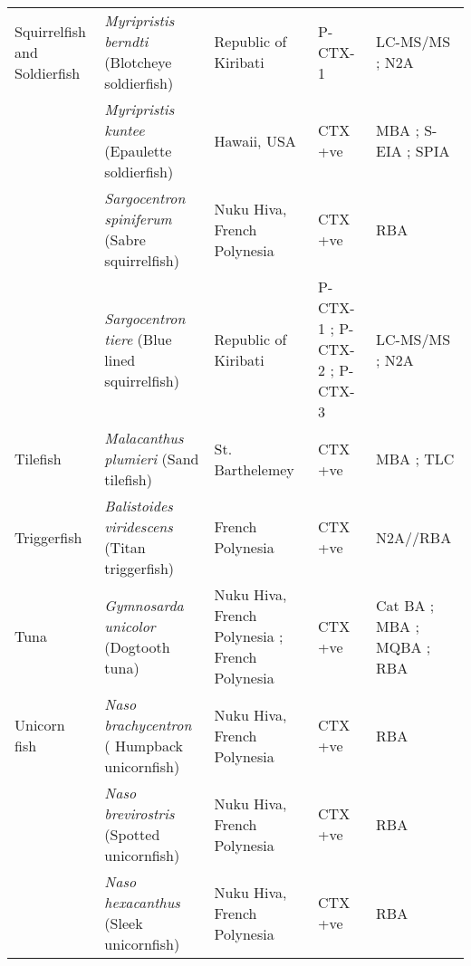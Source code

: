 \documentclass[12pt]{article}
\begin{document}
\begin{longtable}[l]{ | p{2cm} | p{3cm} | p{4.5cm} | p{2cm} | p{3cm} | }
	\hline
	Squirrelfish and Soldierfish & \emph{Myripristis berndti} (Blotcheye soldierfish) & Republic of Kiribati \cite{mak2013pacific} & P-CTX-1 \cite{mak2013pacific} & LC-MS/MS \cite{mak2013pacific}; N2A \cite{mak2013pacific} \\
	& \emph{Myripristis kuntee} (Epaulette soldierfish) & Hawaii, USA \cite{hokama1993evaluation} & CTX +ve \cite{hokama1993evaluation} & MBA \cite{hokama1993evaluation}; S-EIA \cite{hokama1993evaluation}; SPIA \cite{hokama1993evaluation}\\
	& \emph{Sargocentron spiniferum} (Sabre squirrelfish) & Nuku Hiva, French Polynesia \cite{darius2007ciguatera} & CTX +ve \cite{darius2007ciguatera} & RBA \cite{darius2007ciguatera} \\
	& \emph{Sargocentron tiere} (Blue lined squirrelfish) & Republic of Kiribati \cite{mak2013pacific} & P-CTX-1 \cite{mak2013pacific}; P-CTX-2 \cite{mak2013pacific}; P-CTX-3 \cite{mak2013pacific} & LC-MS/MS \cite{mak2013pacific}; N2A \cite{mak2013pacific} \\
	\hline
	Tilefish & \emph{Malacanthus plumieri} (Sand tilefish) & St. Barthelemey \cite{vernoux1986heterogeneity} & CTX +ve \cite{vernoux1986heterogeneity} & MBA \cite{vernoux1986heterogeneity}; TLC \cite{vernoux1986heterogeneity} \\
	\hline
	Triggerfish & \emph{Balistoides viridescens} (Titan triggerfish) & French Polynesia \cite{chinain2014mail} & CTX +ve \cite{chinain2014mail} & N2A//RBA \cite{chinain2014mail} \\
	\hline
	Tuna & \emph{Gymnosarda unicolor} (Dogtooth tuna) & Nuku Hiva, French Polynesia \cite{darius2007ciguatera}; French Polynesia \cite{bagnis1987use} & CTX +ve \cite{darius2007ciguatera,bagnis1987use} & Cat BA \cite{bagnis1987use}; MBA \cite{bagnis1987use}; MQBA \cite{bagnis1987use}; RBA \cite{darius2007ciguatera}\\
	\hline
	Unicorn fish & \emph{Naso brachycentron} ( Humpback unicornfish) & Nuku Hiva, French Polynesia \cite{darius2007ciguatera} & CTX +ve \cite{darius2007ciguatera} & RBA \cite{darius2007ciguatera} \\
	& \emph{Naso brevirostris} (Spotted unicornfish) & Nuku Hiva, French Polynesia \cite{darius2007ciguatera} & CTX +ve \cite{darius2007ciguatera} & RBA \cite{darius2007ciguatera} \\
	& \emph{Naso hexacanthus} (Sleek unicornfish) & Nuku Hiva, French Polynesia \cite{darius2007ciguatera} & CTX +ve \cite{darius2007ciguatera} & RBA \cite{darius2007ciguatera} \\

\end{longtable}
\end{document}
